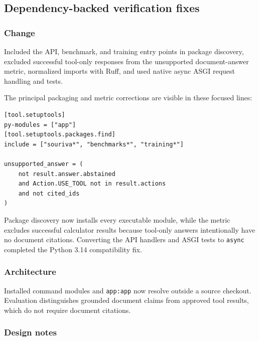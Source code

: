 
\subsection{Dependency-backed verification fixes}


\subsubsection{Change}

Included the API, benchmark, and training entry points in package discovery, excluded successful tool-only responses from the unsupported document-answer metric, normalized imports with Ruff, and used native async ASGI request handling and tests.

The principal packaging and metric corrections are visible in these focused lines:

\begin{verbatim}
[tool.setuptools]
py-modules = ["app"]
[tool.setuptools.packages.find]
include = ["souriva*", "benchmarks*", "training*"]

unsupported_answer = (
    not result.answer.abstained
    and Action.USE_TOOL not in result.actions
    and not cited_ids
)
\end{verbatim}

Package discovery now installs every executable module, while the metric excludes successful calculator results because tool-only answers intentionally have no document citations. Converting the API handlers and ASGI tests to \texttt{async} completed the Python 3.14 compatibility fix.

\subsubsection{Architecture}

Installed command modules and \texttt{app:app} now resolve outside a source checkout. Evaluation distinguishes grounded document claims from approved tool results, which do not require document citations.

\subsubsection{Design notes}

